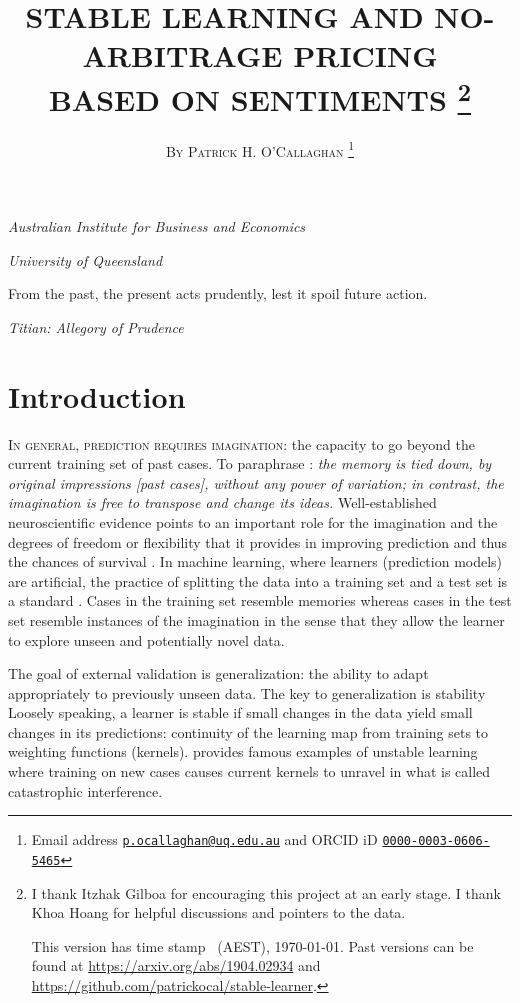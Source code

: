 \documentclass[12pt,a4paper,twoside]{article}
\title{\MakeUppercase{Stable learning and no-arbitrage pricing\\ based
on sentiments} \footnote{I thank Itzhak Gilboa for encouraging this project at
an early stage. I thank Khoa Hoang for helpful discussions and pointers to the
data.

    This version has time stamp \currenttime~(AEST), \today. Past versions can
    be found at \url{https://arxiv.org/abs/1904.02934} and
    \url{https://github.com/patrickocal/stable-learner}.}}
\author{\large\textsc{By Patrick H. O'Callaghan} \footnote{Email address
    \href{mailto:p.ocallaghan@uq.edu.au}{\texttt{p.ocallaghan@uq.edu.au}} and
    ORCID iD \href{http://orcid.org/0000-0003-0606-5465}{
      \texttt{0000-0003-0606-5465}}}}
\date{}
\makeatletter
\renewcommand\maketitle
  {\begin{center}\mdseries\large
    {\@title}%
    \par\medskip\medskip
    {\normalsize\@author}%
    \par\medskip\medskip\normalfont
    \begin{small}
\emph{Australian Institute for Business and Economics}
\end{small}
\par
\begin{small}
\emph{University of Queensland}
\end{small}
   \end{center}
 } \makeatother
\makeatother
\begin{document}
  \maketitle
  \pagestyle{fancy}
\renewcommand{\abstractname}{\vspace{-\baselineskip}} \thispagestyle{plain}
%
\begin{abstract}
  
\end{abstract}
  \setlength{\epigraphwidth}{11.5cm} \epigraph{From the past, the
  present acts prudently, lest it spoil future action.}{\emph{Titian:  Allegory
  of Prudence}}

  \section{Introduction} \label{sec-introduction} \textsc{In general,
  prediction requires imagination}: the capacity to go beyond the current
  training set of past cases. To paraphrase \citep[pages 9 and
  10]{hume1896treatise}: \emph{the memory is tied down, by original impressions
  \emph{[past cases]}, without any power of variation; in contrast, the
  imagination is free to transpose and change its ideas.} Well-established
  neuroscientific evidence points to an important role for the imagination and
  the degrees of freedom or flexibility that it provides in improving
  prediction and thus the chances of survival
  \citep{bartlett1932remembering,suddendorf2007evolution,mullally2013memory}.
  In machine learning, where learners (prediction models) are artificial, the
  practice of splitting the data into a training set and a test set is a
  standard \citep{hastie2009elements}. Cases in the training set resemble
  memories whereas cases in the test set resemble instances of the imagination
  in the sense that they allow the learner to explore unseen and potentially
  novel data.

  The goal of external validation is generalization: the ability to adapt
  appropriately to previously unseen data.  The key to generalization is
  stability
  \citep{bousquet2002stability,poggio2004general,mukherjee2006learning} Loosely
  speaking, a learner is stable if small changes in the data yield small
  changes in its predictions: continuity of the learning map from training sets
  to weighting functions (kernels).  \cite{mccloskey1989catastrophic} provides
  famous examples of unstable learning where training on new cases causes
  current kernels to unravel in what is called catastrophic interference.
\end{document}
